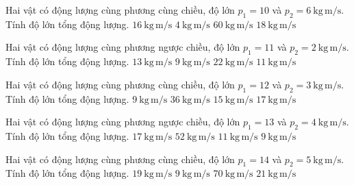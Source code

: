 \begin{ex}
Hai vật có động lượng cùng phương cùng chiều, độ lớn $p_1=10$ và $p_2=6\ \mathrm{kg\,m/s}$. Tính độ lớn tổng động lượng.
\choice
{\True $16\ \mathrm{kg\,m/s}$}
{$4\ \mathrm{kg\,m/s}$}
{$60\ \mathrm{kg\,m/s}$}
{$18\ \mathrm{kg\,m/s}$}
\end{ex}

\begin{ex}
Hai vật có động lượng cùng phương ngược chiều, độ lớn $p_1=11$ và $p_2=2\ \mathrm{kg\,m/s}$. Tính độ lớn tổng động lượng.
\choice
{$13\ \mathrm{kg\,m/s}$}
{\True $9\ \mathrm{kg\,m/s}$}
{$22\ \mathrm{kg\,m/s}$}
{$11\ \mathrm{kg\,m/s}$}
\end{ex}

\begin{ex}
Hai vật có động lượng cùng phương cùng chiều, độ lớn $p_1=12$ và $p_2=3\ \mathrm{kg\,m/s}$. Tính độ lớn tổng động lượng.
\choice
{$9\ \mathrm{kg\,m/s}$}
{$36\ \mathrm{kg\,m/s}$}
{\True $15\ \mathrm{kg\,m/s}$}
{$17\ \mathrm{kg\,m/s}$}
\end{ex}

\begin{ex}
Hai vật có động lượng cùng phương ngược chiều, độ lớn $p_1=13$ và $p_2=4\ \mathrm{kg\,m/s}$. Tính độ lớn tổng động lượng.
\choice
{$17\ \mathrm{kg\,m/s}$}
{$52\ \mathrm{kg\,m/s}$}
{$11\ \mathrm{kg\,m/s}$}
{\True $9\ \mathrm{kg\,m/s}$}
\end{ex}

\begin{ex}
Hai vật có động lượng cùng phương cùng chiều, độ lớn $p_1=14$ và $p_2=5\ \mathrm{kg\,m/s}$. Tính độ lớn tổng động lượng.
\choice
{\True $19\ \mathrm{kg\,m/s}$}
{$9\ \mathrm{kg\,m/s}$}
{$70\ \mathrm{kg\,m/s}$}
{$21\ \mathrm{kg\,m/s}$}
\end{ex}

